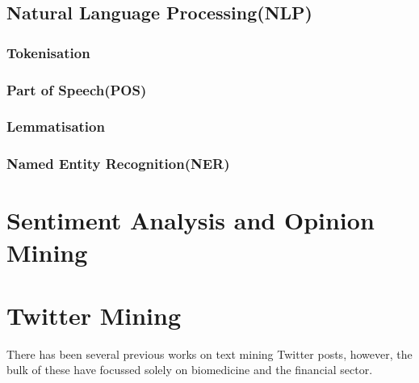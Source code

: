 \subsection[Natural Language Processing]{Natural Language Processing(NLP)}
\subsubsection{Tokenisation}
\subsubsection{Part of Speech(POS)}
\subsubsection{Lemmatisation}
\subsubsection{Named Entity Recognition(NER)}




\section[Sentiment Analysis]{Sentiment Analysis and Opinion Mining}

\section{Twitter Mining}
There has been several previous works on text mining Twitter posts, however, the bulk of these have focussed solely on biomedicine and the financial sector.


